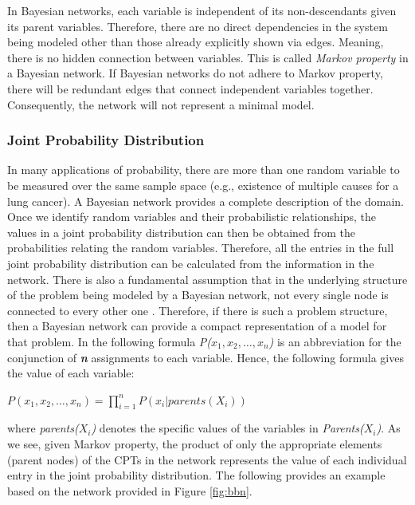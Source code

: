 \documentclass[11pt]{article}
\begin{document}
In Bayesian networks, each variable is independent of its non-descendants given
its parent variables. Therefore, there are no direct dependencies in the system
being modeled other than those already explicitly shown via edges. Meaning,
there is no hidden connection between variables. This is called \textit{Markov
property} in a Bayesian network. If Bayesian networks do not adhere to Markov
property, there will be redundant edges that connect independent variables
together. Consequently, the network will not represent a minimal model.

\subsubsection{Joint Probability Distribution}

In many applications of probability, there are more than one random variable to
be measured over the same sample space (e.g., existence of multiple causes
for a lung cancer). A Bayesian network provides a complete description of the
domain. Once we identify random variables and their probabilistic relationships,
the values in a joint probability distribution can then be obtained from the
probabilities relating the random variables. Therefore, all the entries in the
full joint probability distribution can be calculated from the information in
the network. There is also a fundamental assumption that in the underlying
structure of the problem being modeled by a Bayesian network, not every single
node is connected to every other one \cite{korb:bayesian-ai}. Therefore, if
there is such a problem structure, then a Bayesian network can provide a compact
representation of a model for that problem. In the following formula
\textit{P($x_1, x_2, \ldots, x_n$)} is an abbreviation for the conjunction of
\textit{\textbf{n}} assignments to each variable. Hence, the following formula
gives the value of each variable:

\begin{center}
$P(x_1, x_2, \ldots, x_n) = \prod\limits_{i=1}^{n} P(x_i | parents (X_i))$\\	
\end{center}

\noindent where \textit{parents($X_i$)} denotes the specific values of the
variables in \textit{Parents($X_i$)}. As we see, given Markov property, the
product of only the appropriate elements (parent nodes) of the CPTs in the
network represents the value of each individual entry in the joint probability
distribution. The following provides an example based on the network provided in
Figure \ref{fig:bbn}.\\
\end{document}
